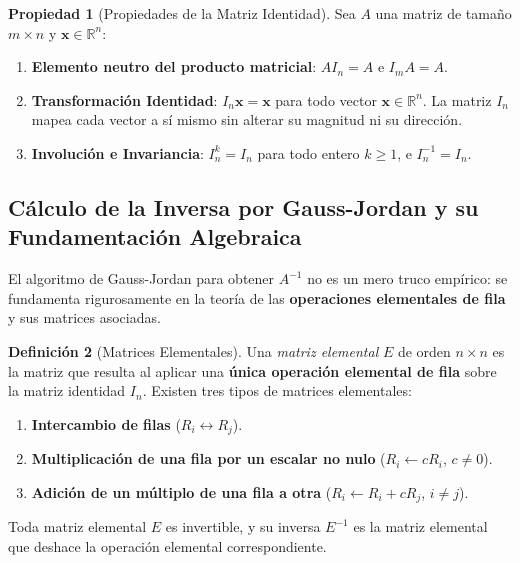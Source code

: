 \documentclass[11pt,letterpaper]{article}
\theoremstyle{definition}
\newtheorem{definicion}{Definición}[section]
\newtheorem{propiedad}[definicion]{Propiedad}
\theoremstyle{plain}
\newcommand{\R}{\mathbb{R}}
\newcommand{\vv}[1]{\mathbf{#1}}
\begin{document}
\begin{propiedad}[Propiedades de la Matriz Identidad]
Sea $A$ una matriz de tamaño $m\times n$ y $\vv{x} \in \R^n$:
\begin{enumerate}[label=(\roman*)]
  \item \textbf{Elemento neutro del producto matricial}: $A I_n = A$ e $I_m A = A$.
  \item \textbf{Transformación Identidad}: $I_n \vv{x} = \vv{x}$ para todo vector $\vv{x} \in \R^n$. La matriz $I_n$ mapea cada vector a sí mismo sin alterar su magnitud ni su dirección.
  \item \textbf{Involución e Invariancia}: $I_n^k = I_n$ para todo entero $k \geq 1$, e $I_n^{-1} = I_n$.
\end{enumerate}
\end{propiedad}

\subsection{Cálculo de la Inversa por Gauss-Jordan y su Fundamentación Algebraica}

El algoritmo de Gauss-Jordan para obtener $A^{-1}$ no es un mero truco empírico: se fundamenta rigurosamente en la teoría de las \textbf{operaciones elementales de fila} y sus matrices asociadas.

\begin{definicion}[Matrices Elementales]
Una \emph{matriz elemental} $E$ de orden $n\times n$ es la matriz que resulta al aplicar una \textbf{única operación elemental de fila} sobre la matriz identidad $I_n$. Existen tres tipos de matrices elementales:
\begin{enumerate}[label=\arabic*.]
  \item \textbf{Intercambio de filas} ($R_i \leftrightarrow R_j$).
  \item \textbf{Multiplicación de una fila por un escalar no nulo} ($R_i \leftarrow c R_i$, $c \neq 0$).
  \item \textbf{Adición de un múltiplo de una fila a otra} ($R_i \leftarrow R_i + c R_j$, $i \neq j$).
\end{enumerate}
Toda matriz elemental $E$ es invertible, y su inversa $E^{-1}$ es la matriz elemental que deshace la operación elemental correspondiente.
\end{definicion}
\end{document}
